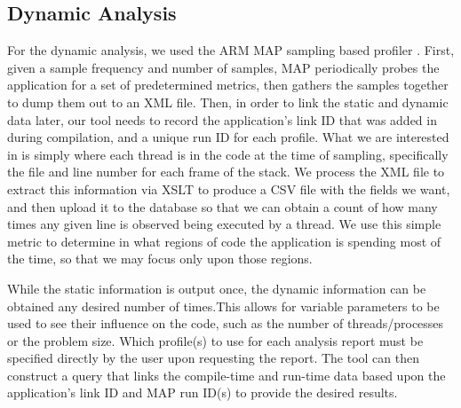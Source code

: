 
\subsection{Dynamic Analysis}
\label{sec:dynamic}
For the dynamic analysis, we used the ARM MAP sampling based profiler \cite{arm-docs}.
First, given a sample frequency and number of samples, MAP periodically probes the application for 
a set of predetermined metrics, then gathers the samples together to dump them out to an \acs{XML} 
file. Then, in order to link the static and dynamic data later, our tool needs to record the application's 
link ID that was added in during compilation, and a unique run ID for each profile.
What we are interested in is simply where each thread is in the code at the time of sampling, 
specifically the file and line number for each frame of the stack.
We process the \acs{XML} file to extract this information via \ac{XSLT} to produce a \acs{CSV} file 
with the fields we want, and then upload it to the database so that we can obtain a count of how 
many 
times any given line is observed being executed by a thread.
We use this simple metric to determine in what regions of code the application is spending most of 
the time, so that we may focus only upon those regions.

While the static information is output once, the dynamic information can be obtained any desired 
number of times.This allows for variable parameters to be used to see their influence on the code, 
such as the number of threads/processes or the problem size. Which profile(s) to use for each 
analysis report must be specified directly by the user upon requesting the report.
The tool can then construct a query that links the compile-time and run-time data based upon the 
application's link ID and MAP run ID(s) to provide the desired results.
